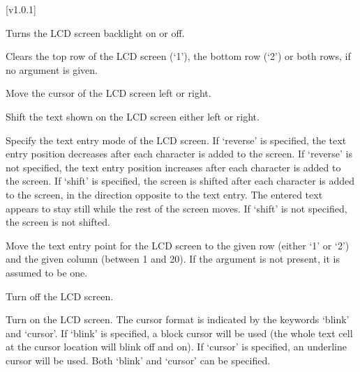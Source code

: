 [v1.0.1]




\pluginItemCommands[]

  \pluginListCmdBegin

  Turns the LCD screen backlight on or off.

  Clears the top row of the LCD screen (`1'), the bottom row (`2') or both rows, if no argument is given.

  Move the cursor of the LCD screen left or right.

  Shift the text shown on the LCD screen either left or right.

  Specify the text entry mode of the LCD screen.
  If `reverse' is specified, the text entry position decreases after each character is added to the screen.
  If `reverse' is not specified, the text entry position increases after each character is added to the screen.
  If `shift' is specified, the screen is shifted after each character is added to the screen,
  in the direction opposite to the text entry.
  The entered text appears to stay still while the rest of the screen moves.
  If `shift' is not specified, the screen is not shifted.

  Move the text entry point for the LCD screen to the given row (either `1' or `2') and the given column (between 1 and 20).
  If the argument  is not present, it is assumed to be one.

  Turn off the LCD screen.

  Turn on the LCD screen.
  The cursor format is indicated by the keywords `blink' and `cursor'.
  If `blink' is specified, a block cursor will be used (the whole text cell at the cursor location will blink off and on).
  If `cursor' is specified, an underline cursor will be used.
  Both `blink' and `cursor' can be specified.

